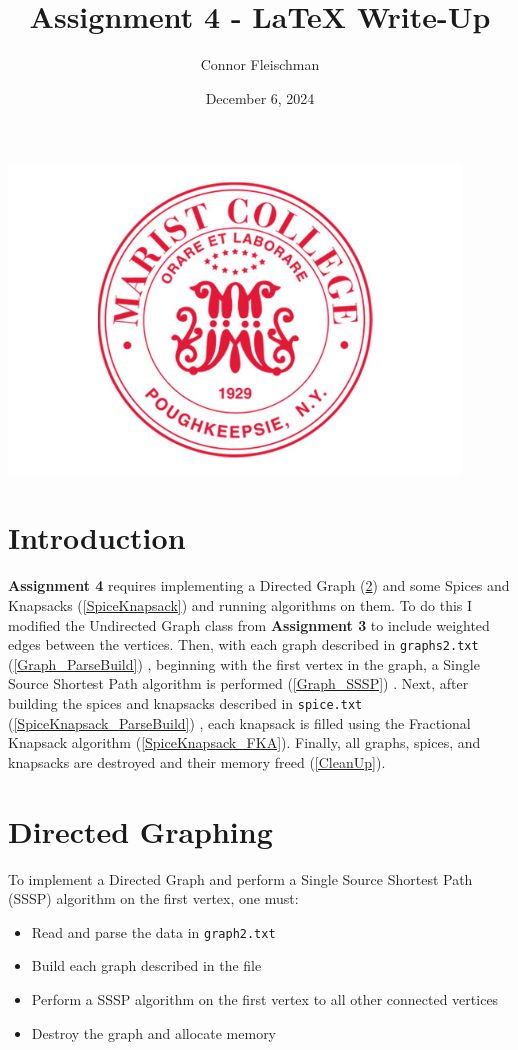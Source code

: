 \documentclass[12pt, letterpaper]{article}
\title{Assignment 4 - LaTeX Write-Up}
\author{Connor Fleischman}
\date{December 6, 2024}
\begin{document}
\maketitle
\begin{center}
   \includegraphics[width=120mm,scale=0.5]{MaristSeal.png}
\end{center}
\newpage

\tableofcontents
\newpage
\setcounter{page}{1} %

\section{Introduction}
\textbf{Assignment 4} requires implementing a Directed Graph (\ref{Graph}) and some Spices and Knapsacks (\ref{SpiceKnapsack}) and running algorithms on them.
To do this I modified the Undirected Graph class from \textbf{Assignment 3} to include weighted edges between the vertices.
Then, with each graph described in \texttt{graphs2.txt} (\ref{Graph_ParseBuild}) , beginning with the first vertex in the graph, a Single Source Shortest Path algorithm is performed (\ref{Graph_SSSP}) .
Next, after building the spices and knapsacks described in \texttt{spice.txt} (\ref{SpiceKnapsack_ParseBuild}) , each knapsack is filled using the Fractional Knapsack algorithm (\ref{SpiceKnapsack_FKA}).
Finally, all graphs, spices, and knapsacks are destroyed and their memory freed (\ref{CleanUp}).

\section{Directed Graphing} \label{Graph}
To implement a Directed Graph and perform a Single Source Shortest Path (SSSP) algorithm on the first vertex, one must:
\begin{itemize}
   \item Read and parse the data in \texttt{graph2.txt}
   \item Build each graph described in the file
   \item Perform a SSSP algorithm on the first vertex to all other connected vertices
   \item Destroy the graph and allocate memory
\end{itemize}
\end{document}
